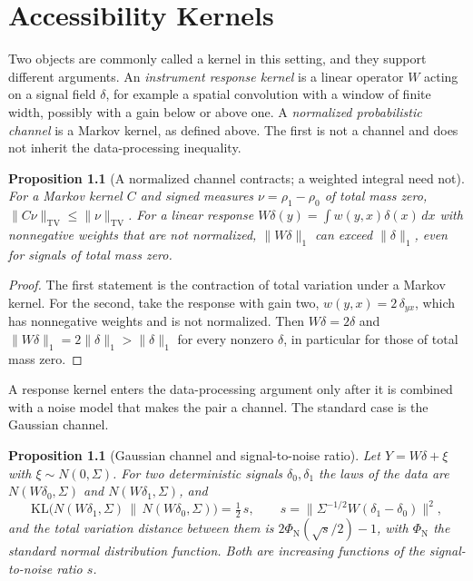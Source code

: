 \documentclass[11pt,oneside]{book}
\newtheorem{proposition}[theorem]{Proposition}
\theoremstyle{definition}
\theoremstyle{remark}
\begin{document}
\chapter{Accessibility Kernels}\label{ch:kernels}

Two objects are commonly called a kernel in this setting, and they support different arguments. An \emph{instrument response kernel} is a linear operator $W$ acting on a signal field $\delta$, for example a spatial convolution with a window of finite width, possibly with a gain below or above one. A \emph{normalized probabilistic channel} is a Markov kernel, as defined above. The first is not a channel and does not inherit the data-processing inequality.

\begin{proposition}[A normalized channel contracts; a weighted integral need not]\label{prop:contract}
For a Markov kernel $C$ and signed measures $\nu=\rho_1-\rho_0$ of total mass zero, $\|C\nu\|_{\mathrm{TV}}\leq\|\nu\|_{\mathrm{TV}}$. For a linear response $W\delta(y)=\int w(y,x)\delta(x)\,dx$ with nonnegative weights that are not normalized, $\|W\delta\|_{1}$ can exceed $\|\delta\|_1$, even for signals of total mass zero.
\end{proposition}

\begin{proof}
The first statement is the contraction of total variation under a Markov kernel. For the second, take the response with gain two, $w(y,x)=2\,\delta_{yx}$, which has nonnegative weights and is not normalized. Then $W\delta=2\delta$ and $\|W\delta\|_1=2\|\delta\|_1>\|\delta\|_1$ for every nonzero $\delta$, in particular for those of total mass zero.
\end{proof}

A response kernel enters the data-processing argument only after it is combined with a noise model that makes the pair a channel. The standard case is the Gaussian channel.

\begin{proposition}[Gaussian channel and signal-to-noise ratio]\label{prop:gaussian}
Let $Y=W\delta+\xi$ with $\xi\sim N(0,\Sigma)$. For two deterministic signals $\delta_0,\delta_1$ the laws of the data are $N(W\delta_0,\Sigma)$ and $N(W\delta_1,\Sigma)$, and
\[
\mathrm{KL}\bigl(N(W\delta_1,\Sigma)\,\|\,N(W\delta_0,\Sigma)\bigr)=\tfrac12\,s,\qquad s=\bigl\|\Sigma^{-1/2}W(\delta_1-\delta_0)\bigr\|^2,
\]
and the total variation distance between them is $2\Phi_{\mathrm N}(\sqrt s/2)-1$, with $\Phi_{\mathrm N}$ the standard normal distribution function. Both are increasing functions of the signal-to-noise ratio $s$.
\end{proposition}
\end{document}

